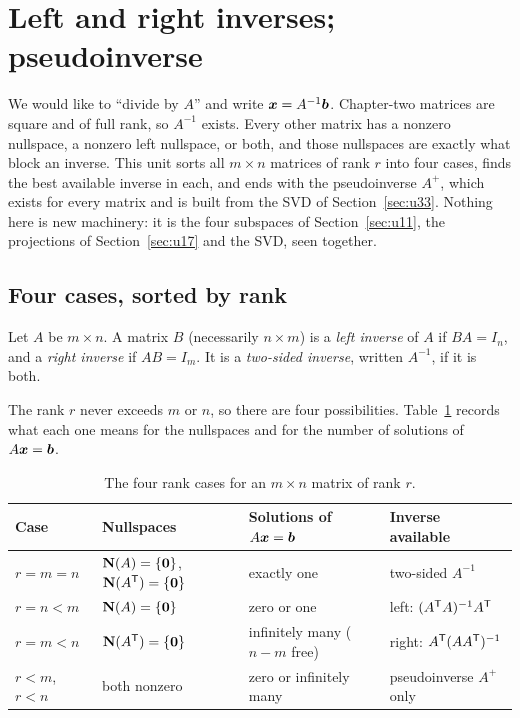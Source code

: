 \section{Left and right inverses; pseudoinverse}\label{sec:u36}

We would like to ``divide by $A$'' and write $\boldsymbol{x}=A^{-1}\boldsymbol{b}$. Chapter-two matrices are square and of full rank, so $A^{-1}$ exists. Every other matrix has a nonzero nullspace, a nonzero left nullspace, or both, and those nullspaces are exactly what block an inverse. This unit sorts all $m\times n$ matrices of rank $r$ into four cases, finds the best available inverse in each, and ends with the pseudoinverse $A^{+}$, which exists for every matrix and is built from the SVD of Section~\ref{sec:u33}. Nothing here is new machinery: it is the four subspaces of Section~\ref{sec:u11}, the projections of Section~\ref{sec:u17} and the SVD, seen together.

\subsection{Four cases, sorted by rank}

\begin{definition}\label{def:u36-inverses}
Let $A$ be $m\times n$. A matrix $B$ (necessarily $n\times m$) is a \emph{left inverse} of $A$ if $BA=I_n$, and a \emph{right inverse} if $AB=I_m$. It is a \emph{two-sided inverse}, written $A^{-1}$, if it is both.
\end{definition}

The rank $r$ never exceeds $m$ or $n$, so there are four possibilities. Table~\ref{tab:u36-cases} records what each one means for the nullspaces and for the number of solutions of $A\boldsymbol{x}=\boldsymbol{b}$.

\begin{table}[ht]\centering\small
\caption{The four rank cases for an $m\times n$ matrix of rank $r$.}\label{tab:u36-cases}
\begin{tabular}{@{}llll@{}}
\toprule
Case & Nullspaces & Solutions of $A\boldsymbol{x}=\boldsymbol{b}$ & Inverse available \\
\midrule
$r=m=n$ & $\mathbf{N}(A)=\{\boldsymbol{0}\}$, $\mathbf{N}(A^{\mathsf{T}})=\{\boldsymbol{0}\}$ & exactly one & two-sided $A^{-1}$ \\
$r=n<m$ & $\mathbf{N}(A)=\{\boldsymbol{0}\}$ & zero or one & left: $(A^{\mathsf{T}} A)^{-1}A^{\mathsf{T}}$ \\
$r=m<n$ & $\mathbf{N}(A^{\mathsf{T}})=\{\boldsymbol{0}\}$ & infinitely many ($n-m$ free) & right: $A^{\mathsf{T}}(AA^{\mathsf{T}})^{-1}$ \\
$r<m$, $r<n$ & both nonzero & zero or infinitely many & pseudoinverse $A^{+}$ only \\
\bottomrule
\end{tabular}
\end{table}

